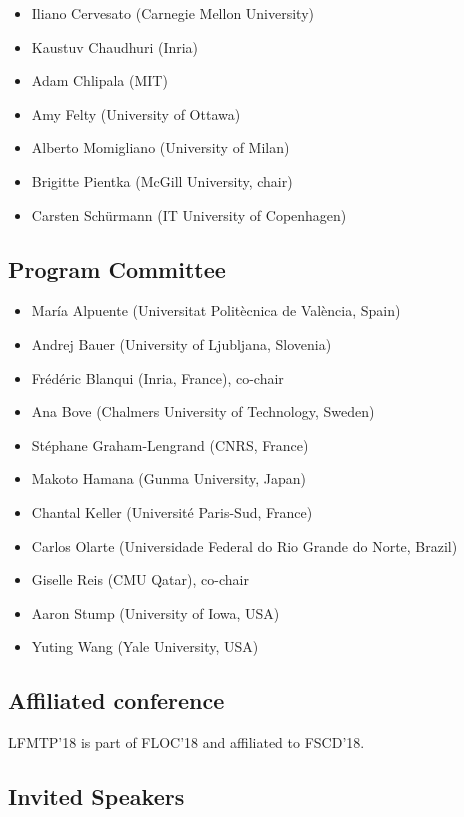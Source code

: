 \documentclass{article}
\begin{document}
\begin{itemize}
\item Iliano Cervesato (Carnegie Mellon University)
\item Kaustuv Chaudhuri (Inria)
\item Adam Chlipala (MIT)
\item Amy Felty (University of Ottawa)
\item Alberto Momigliano (University of Milan)
\item Brigitte Pientka (McGill University, chair)
\item Carsten Schürmann (IT University of Copenhagen) 
\end{itemize}

\subsection{Program Committee}

\begin{itemize}
\item Mar\'{i}a Alpuente (Universitat Polit\`{e}cnica de Val\`{e}ncia, Spain)
\item Andrej Bauer (University of Ljubljana, Slovenia)
\item Fr\'{e}d\'{e}ric Blanqui (Inria, France), co-chair
\item Ana Bove (Chalmers University of Technology, Sweden)
\item St\'{e}phane Graham-Lengrand (CNRS, France)
\item Makoto Hamana (Gunma University, Japan)
\item Chantal Keller (Universit\'{e} Paris-Sud, France)
\item Carlos Olarte (Universidade Federal do Rio Grande do Norte, Brazil)
\item Giselle Reis (CMU Qatar), co-chair
\item Aaron Stump (University of Iowa, USA)
\item Yuting Wang (Yale University, USA)
\end{itemize}

\subsection{Affiliated conference}

LFMTP'18 is part of FLOC'18 and affiliated to FSCD'18.

\subsection{Invited Speakers}
\end{document}
